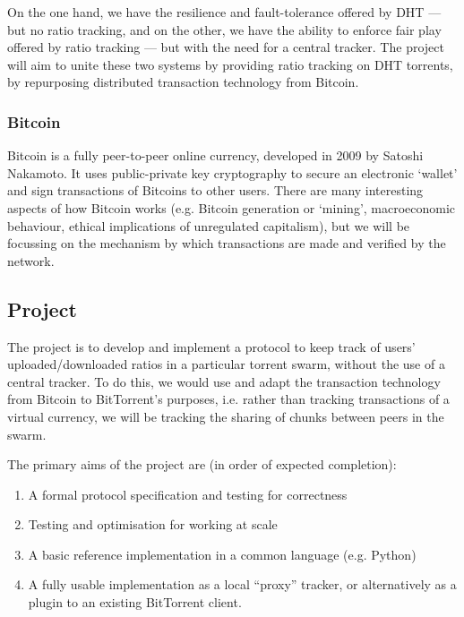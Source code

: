 \documentclass{article}
\begin{document}
On the one hand, we have the resilience and fault-tolerance offered by DHT --- but no ratio tracking, and on the other, we have the ability to enforce fair play offered by ratio tracking --- but with the need for a central tracker.  The project will aim to unite these two systems by providing ratio tracking on DHT torrents, by repurposing distributed transaction technology from Bitcoin.

\subsubsection{Bitcoin}
Bitcoin is a fully peer-to-peer online currency, developed in 2009 by Satoshi Nakamoto.  It uses public-private key cryptography to secure an electronic `wallet' and sign transactions of Bitcoins to other users.  There are many interesting aspects of how Bitcoin works (e.g. Bitcoin generation or `mining', macroeconomic behaviour, ethical implications of unregulated capitalism), but we will be focussing on the mechanism by which transactions are made and verified by the network.

\subsection{Project}

The project is to develop and implement a protocol to keep track of users' uploaded/downloaded ratios in a particular torrent swarm, without the use of a central tracker.  To do this, we would use and adapt the transaction technology from Bitcoin to BitTorrent's purposes, i.e. rather than tracking transactions of a virtual currency, we will be tracking the sharing of chunks between peers in the swarm.


The primary aims of the project are (in order of expected completion):
\begin{enumerate}
\item A formal protocol specification and testing for correctness
\item Testing and optimisation for working at scale
\item A basic reference implementation in a common language (e.g. Python)
\item A fully usable implementation as a local ``proxy'' tracker, or alternatively as a plugin to an existing BitTorrent client.
\end{enumerate}
\end{document}

